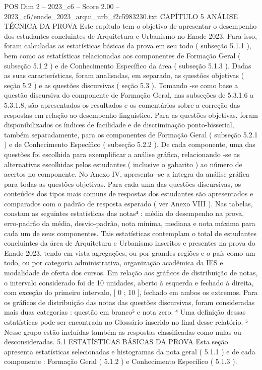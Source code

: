 \begin{textsample}{POS Dim 2 – 2023\_c6 – Score 2.00 – 2023\_c6/enade\_2023\_arqui\_urb\_f2c5983230.txt}  \label{ex:f2_pos_168}
CAPÍTULO 5 ANÁLISE TÉCNICA DA PROVA Este capítulo tem o objetivo de apresentar o desempenho dos estudantes concluintes de Arquitetura e Urbanismo no Enade 2023.
Para isso, foram calculadas as estatísticas básicas da prova em seu todo ( subseção 5.1.1 ), bem como as estatísticas relacionadas aos componentes de Formação Geral ( subseção 5.1.2 ) e de Conhecimento Específico da área ( subseção 5.1.3 ).
Dadas as suas características, foram analisadas, em separado, as questões objetivas ( seção 5.2 ) e as questões discursivas ( seção 5.3 ).
Tomando -se como base a questão discursiva do componente de Formação Geral, nas subseções de 5.3.1.6 a 5.3.1.8, são apresentados os resultados e os comentários sobre a correção das respostas em relação ao desempenho linguístico.
Para as questões objetivas, foram disponibilizados os índices de facilidade e de discriminação ponto-bisserial, também separadamente, para os componentes de Formação Geral ( subseção 5.2.1 ) e de Conhecimento Específico ( subseção 5.2.2 ).
De cada componente, uma das questões foi escolhida para exemplificar a análise gráfica, relacionando -se as alternativas escolhidas pelos estudantes ( inclusive o gabarito ) ao número de acertos no componente.
No Anexo IV, apresenta -se a íntegra da análise gráfica para todas as questões objetivas.
Para cada uma das questões discursivas, os conteúdos dos tipos mais comuns de respostas dos estudantes são apresentados e comparados com o padrão de resposta esperado ( ver Anexo VIII ).
Nas tabelas, constam as seguintes estatísticas das notas⁴ : média do desempenho na prova, erro-padrão da média, desvio-padrão, nota mínima, mediana e nota máxima para cada um de seus componentes.
Tais estatísticas contemplam o total de estudantes concluintes da área de Arquitetura e Urbanismo inscritos e presentes na prova do Enade 2023, tendo em vista agregações, ou por grandes regiões e o país como um todo, ou por categoria administrativa, organização acadêmica da IES e modalidade de oferta dos cursos.
Em relação aos gráficos de distribuição de notas, o intervalo considerado foi de 10 unidades, aberto à esquerda e fechado à direita, com exceção do primeiro intervalo, [ 0 ; 10 ], fechado em ambos os extremos.
Para os gráficos de distribuição das notas das questões discursivas, foram consideradas mais duas categorias : questão em branco⁵ e nota zero. ⁴ Uma definição dessas estatísticas pode ser encontrada no Glossário inserido no final desse relatório. ⁵ Nesse grupo estão incluídas também as respostas classificadas como nulas ou desconsideradas. 5.1 ESTATÍSTICAS BÁSICAS DA PROVA Esta seção apresenta estatísticas selecionadas e histogramas da nota geral ( 5.1.1 ) e de cada componente : Formação Geral ( 5.1.2 ) e Conhecimento Específico ( 5.1.3 ).

\end{textsample}
